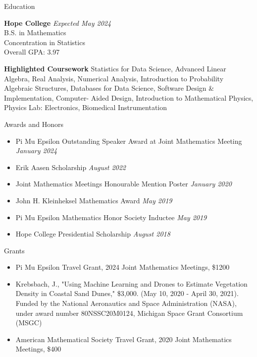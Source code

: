 \documentclass[
	11pt, %
]{resume} %
\begin{document}

\begin{rSection}{Education}
	
	\textbf{Hope College} \hfill \textit{Expected May 2024} \\ 
	B.S. in Mathematics \\
	Concentration in Statistics \smallskip \\
	Overall GPA: 3.97

  \textbf{Highlighted Coursework}
  Statistics for Data Science, Advanced Linear Algebra, Real Analysis, Numerical Analysis, Introduction to Probability Algebraic Structures, Databases for Data Science, Software Design \& Implementation, Computer- Aided Design, Introduction to Mathematical Physics, Physics Lab: Electronics, Biomedical Instrumentation
	
\end{rSection}


\begin{rSection}{Awards and Honors}
  \begin{itemize}
    \item Pi Mu Epsilon Outstanding Speaker Award at Joint Mathematics Meeting \hfill \textit{January 2024}
    \item Erik Aasen Scholarship \hfill \textit{August 2022}

    \item Joint Mathematics Meetings Honourable Mention Poster \hfill \textit{January 2020}
    \item John H. Kleinheksel Mathematics Award \hfill \textit{May 2019} 
\item Pi Mu Epsilon Mathematics Honor Society Inductee \hfill \textit{May 2019} 
\item Hope College Presidential Scholarship \hfill \textit{August 2018} 

  \end{itemize}
    
\end{rSection}

\begin{rSection}{Grants}

  \begin{itemize}
    \item Pi Mu Epsilon Travel Grant, 2024 Joint Mathematics Meetings, \$1200

  \item Krebsbach, J., "Using Machine Learning and Drones to Estimate Vegetation Density in Coastal Sand Dunes," \$3,000. (May 10, 2020 - April 30, 2021). Funded by the National Aeronautics and Space Administration (NASA), under award number 80NSSC20M0124, Michigan Space Grant Consortium (MSGC)

  \item American Mathematical Society Travel Grant, 2020 Joint Mathematics Meetings, \$400
  \end{itemize}
\end{rSection}
\end{document}
